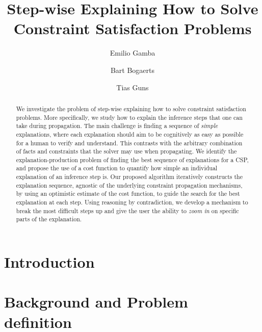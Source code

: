 \documentclass{llncs}
\begin{document}
%
\title{Step-wise Explaining How to Solve Constraint Satisfaction Problems}
%
\author{Emilio Gamba \and
Bart Bogaerts \and
Tias Guns}

%
\maketitle

\begin{abstract}
We investigate the problem of step-wise explaining how to solve constraint satisfaction problems.
More specifically, we study how to explain the inference steps that one can take during propagation.
The main challenge is finding a sequence of \textit{simple} explanations, where each explanation should aim to be cognitively as easy as possible for a human to verify and understand.
This contrasts with the arbitrary combination of facts and constraints that the solver may use  when propagating.
We identify the explanation-production problem of finding the best sequence of explanations for a CSP, and propose the use of a cost function to quantify how simple an individual explanation of an inference step is.
Our proposed algorithm iteratively constructs the explanation sequence, agnostic of the underlying constraint propagation mechanisms, by using an optimistic estimate of the cost function, to guide the search for the best explanation at each step.
Using reasoning by contradiction, we develop a mechanism to break the most difficult steps up and give the user the ability to \emph{zoom in} on specific parts of the explanation.
\end{abstract}
%
%
\section{Introduction}\label{sec:intro}

\section{Background and Problem definition}\label{sec:background}

\end{document}
